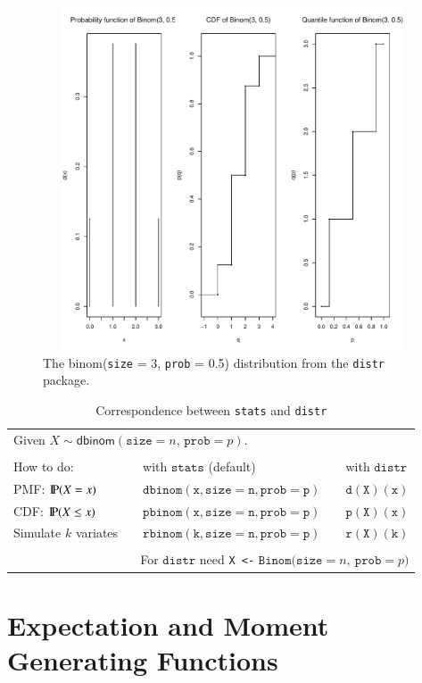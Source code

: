 \documentclass[captions=tableheading]{scrbook}
\begin{document}
\begin{figure}[H]
    \includegraphics[width=5in, height=4in]{img/binom-plot-distr.pdf}
    \caption[The \textsf{binom}(\texttt{size} = 3, \texttt{prob} = 0.5) distribution from the \texttt{distr} package]{\small The \textsf{binom}(\texttt{size} = 3, \texttt{prob} = 0.5) distribution from the \texttt{distr} package.}
    \label{fig:binom-plot-distr}
  \end{figure}


\begin{table}
\begin{tabular}{lllll}
\multicolumn{5}{l}{Given \(X\sim\mathsf{dbinom}(\mathtt{size}=n,\,\mathtt{prob}=p)\).}\tabularnewline
 &  &  &  & \tabularnewline
How to do: &  & with \(\mathtt{stats}\) (default)  &  & with \(\mathtt{distr}\)\tabularnewline
\hline
PMF: \(\P(X=x)\) &  & \(\mathtt{dbinom(x,size=n,prob=p)}\) &  & \(\mathtt{d(X)(x)}\)\tabularnewline
CDF: \(\P(X\leq x)\) &  & \(\mathtt{pbinom(x,size=n,prob=p)}\) &  & \(\mathtt{p(X)(x)}\)\tabularnewline
Simulate \(k\) variates &  & \(\mathtt{rbinom(k,size=n,prob=p)}\) &  & \(\mathtt{r(X)(k)}\)\tabularnewline
\hline
 &  &  &  & \tabularnewline
\multicolumn{5}{r}{For \(\mathtt{distr}\) need \texttt{X <-} \(\mathtt{Binom(size=}n\mathtt{,\ prob=}p\mathtt{)}\)}\tabularnewline
\end{tabular}

\caption{Correspondence between \texttt{stats} and \texttt{distr}}

\end{table}
\section{Expectation and Moment Generating Functions}
\label{sec-1-4}
\end{document}
